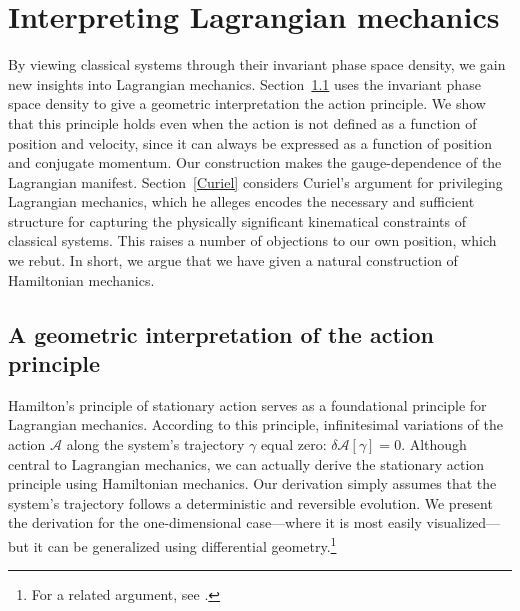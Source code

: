 \documentclass[12pt, english, twoside]{article} %
\begin{document}
\section{Interpreting Lagrangian mechanics}
\label{Lagrangian}

By viewing classical systems through their invariant phase space density, we gain new insights into Lagrangian mechanics. Section~\ref{action} uses the invariant phase space density to give a geometric interpretation the action principle. We show that this principle holds even when the action is not defined as a function of position and velocity, since it can always be expressed as a function of position and conjugate momentum. Our construction makes the gauge-dependence of the Lagrangian manifest. Section~\ref{Curiel} considers Curiel's \parencites*[]{Curiel} argument for privileging Lagrangian mechanics, which he alleges encodes the necessary and sufficient structure for capturing the physically significant kinematical constraints of classical systems. This raises a number of objections to our own position, which we rebut. In short, we  argue that we have given a natural construction of Hamiltonian mechanics.


\subsection{A geometric interpretation of the action principle}
\label{action}


Hamilton's principle of stationary action serves as a foundational principle for Lagrangian mechanics. According to this principle, infinitesimal variations of the action $ \mathscr{A}$ along the system's trajectory $\gamma $ equal zero: $\delta  \mathscr{A}[\gamma] = 0 $. Although central to Lagrangian mechanics, we can actually derive the stationary action principle using Hamiltonian mechanics. Our derivation simply assumes that the system's trajectory follows a deterministic and reversible evolution. We present the derivation for the one-dimensional case---where it is most easily visualized---but it can be generalized using differential geometry.\footnote{For a related argument, see \textcites[236--37, 243--45]{Arnold}.}
\end{document}
